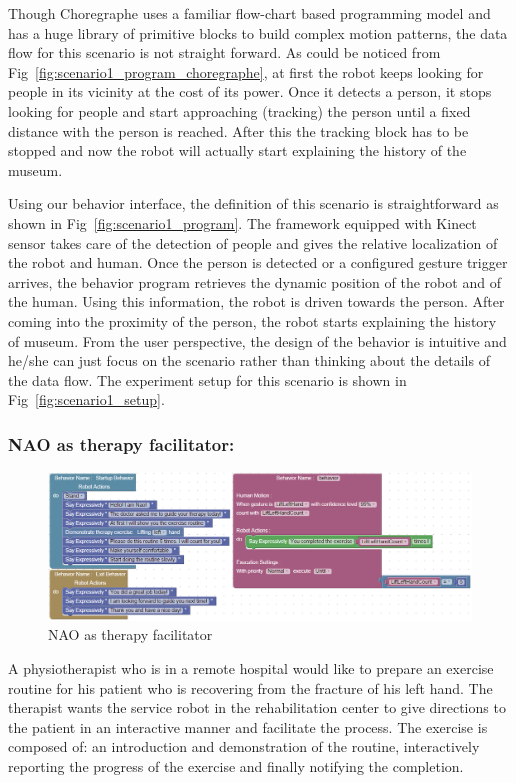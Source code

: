 	Though Choregraphe uses a familiar flow-chart based programming model and has a huge library of primitive blocks to build complex motion patterns, the data flow for this scenario is not straight forward. As could be noticed from Fig~\ref{fig:scenario1_program_choregraphe}, at first the robot keeps looking for people in its vicinity at the cost of its power. Once it detects a person, it stops looking for people and start approaching (tracking) the person until a fixed distance with the person is reached. After this the tracking block has to be stopped and now the robot will actually start explaining the history of the museum.
	
	Using our behavior interface, the definition of this scenario is straightforward as shown in Fig~\ref{fig:scenario1_program}. The framework equipped with Kinect sensor takes care of the detection of people and gives the relative localization of the robot and human. Once the person is detected or a configured gesture trigger arrives, the behavior program retrieves the dynamic position of the robot and of the human. Using this information, the robot is driven towards the person. After coming into the proximity of the person, the robot starts explaining the history of museum. From the user perspective, the design of the behavior is intuitive and he/she can just focus on the scenario rather than thinking about the details of the data flow. The experiment setup for this scenario is shown in Fig~\ref{fig:scenario1_setup}.
\subsubsection{NAO as therapy facilitator:}%
\begin{figure}
\includegraphics[width=\textwidth]{../thesis/assets/scenario2_horizontal.png}
\caption[NAO as therapy facilitator]{NAO as therapy facilitator}
\label{fig:scenario2_program}
\end{figure}
A physiotherapist who is in a remote hospital would like to prepare an exercise routine for his patient who is recovering from the fracture of his left hand. The therapist wants the service robot in the rehabilitation center to give directions to the patient in an interactive manner and facilitate the process. The exercise is composed of: an introduction and demonstration of the routine, interactively reporting the progress of the exercise and finally notifying the completion. 
	
